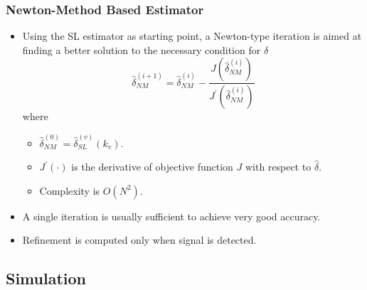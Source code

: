 

\begin{frame}
  \frametitle{Newton-Method Based Estimator}

    \begin{itemize}
    
      \item Using the SL estimator as starting point, a Newton-type
        iteration is aimed at finding a better solution to the necessary condition for $\hat{\delta}$      
      \begin{equation*}
        \label{eq:iter_NM_est}
        \hat{\delta}_{NM}^{(i+1)}=\hat{\delta}_{NM}^{(i)}-
        \frac{J(\hat{\delta}_{NM}^{(i)})}{J^\prime(\hat{\delta}_{NM}^{(i)})}
      \end{equation*}
      where
      \begin{itemize}
        \item $\hat{\delta}_{NM}^{(0)}=\hat{\delta}^{(v)}_{SL}(k_v)$.
        \item $J^\prime(\cdot)$ is the derivative of objective
          function $J$ with respect to $\hat{\delta}$.
        \item Complexity is $O(N^2)$.
      \end{itemize}
      \item A single iteration is usually sufficient to achieve very
        good accuracy.
      \item Refinement is computed only when signal is detected.
        

    \end{itemize}




\end{frame}

\subsection{Simulation}


